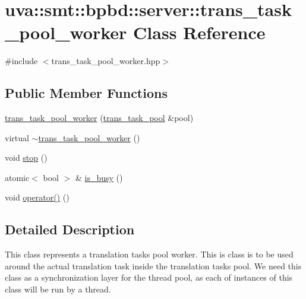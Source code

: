 \hypertarget{classuva_1_1smt_1_1bpbd_1_1server_1_1trans__task__pool__worker}{}\section{uva\+:\+:smt\+:\+:bpbd\+:\+:server\+:\+:trans\+\_\+task\+\_\+pool\+\_\+worker Class Reference}
\label{classuva_1_1smt_1_1bpbd_1_1server_1_1trans__task__pool__worker}


{\ttfamily \#include $<$trans\+\_\+task\+\_\+pool\+\_\+worker.\+hpp$>$}

\subsection*{Public Member Functions}
\begin{DoxyCompactItemize}
\item 
\hyperlink{classuva_1_1smt_1_1bpbd_1_1server_1_1trans__task__pool__worker_af29354a4ec8fd7587053f130bf853c01}{trans\+\_\+task\+\_\+pool\+\_\+worker} (\hyperlink{classuva_1_1smt_1_1bpbd_1_1server_1_1trans__task__pool}{trans\+\_\+task\+\_\+pool} \&pool)
\item 
virtual \hyperlink{classuva_1_1smt_1_1bpbd_1_1server_1_1trans__task__pool__worker_a6660e1b15ec174215ef2de8d9d2025e8}{$\sim$trans\+\_\+task\+\_\+pool\+\_\+worker} ()
\item 
void \hyperlink{classuva_1_1smt_1_1bpbd_1_1server_1_1trans__task__pool__worker_adeb6443bcb2bcf957145548e7bc32a28}{stop} ()
\item 
atomic$<$ bool $>$ \& \hyperlink{classuva_1_1smt_1_1bpbd_1_1server_1_1trans__task__pool__worker_a93e5169286d17d5ca8427bef223f1c49}{is\+\_\+busy} ()
\item 
void \hyperlink{classuva_1_1smt_1_1bpbd_1_1server_1_1trans__task__pool__worker_ade30354690def6d11d450918f0bce63e}{operator()} ()
\end{DoxyCompactItemize}


\subsection{Detailed Description}
This class represents a translation tasks pool worker. This is class is to be used around the actual translation task inside the translation tasks pool. We need this class as a synchronization layer for the thread pool, as each of instances of this class will be run by a thread. 

